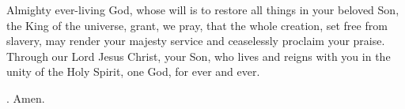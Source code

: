 \lettrine[lines=3]{A}{}lmighty ever-living God, whose will is to restore all things in your beloved Son, the King of the universe, grant, we pray, that the whole creation, set free from slavery, may render your majesty service and ceaselessly proclaim your praise. Through our Lord Jesus Christ, your Son, who lives and reigns with you in the unity of the Holy Spirit, one God, for ever and ever. \par \Rbar. Amen. 
